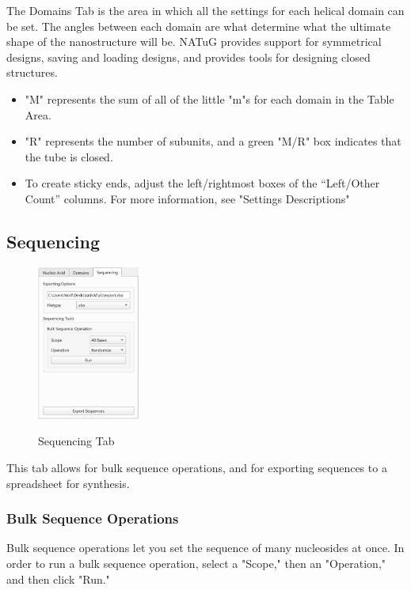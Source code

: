 \documentclass[titlepage]{article}
\begin{document}
	The Domains Tab is the area in which all the settings for each helical domain can be set. The angles between each domain are what determine what the ultimate shape of the nanostructure will be. NATuG provides support for symmetrical designs, saving and loading designs, and provides tools for designing closed structures.
	
	\begin{itemize}
		\item "M" represents the sum of all of the little "m"s for each domain in the Table Area.
		\item "R" represents the number of subunits, and a green "M/R" box indicates that the tube is closed.
		\item To create sticky ends, adjust the left/rightmost boxes of the “Left/Other Count” columns. For more information, see "Settings Descriptions"
	\end{itemize}
	
	\subsection{Sequencing}
	
	\begin{figure}[h]
		\centering
		\caption{Sequencing Tab}
		\includegraphics[height=2in]{sequencing-tab.png}
		\label{fig:sequencing-tab}
	\end{figure}
	
	This tab allows for bulk sequence operations, and for exporting sequences to a spreadsheet for synthesis.
	
	\newpage
	
	\subsubsection{Bulk Sequence Operations}
	Bulk sequence operations let you set the sequence of many nucleosides at once. In order to run a bulk sequence operation, select a "Scope," then an "Operation," and then click "Run."
	
\end{document}
